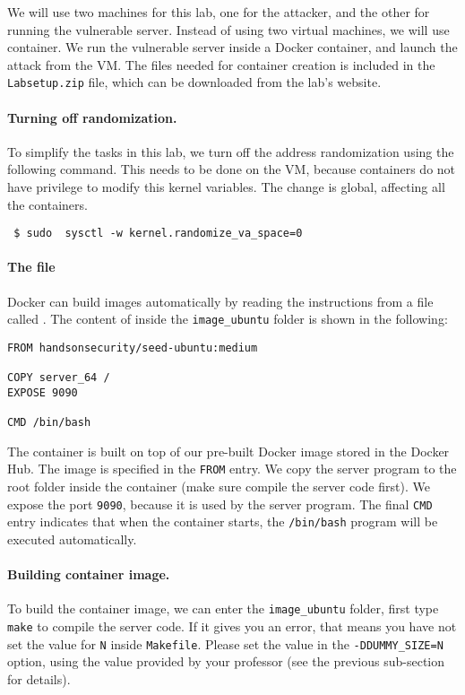 We will use two machines for this lab, one for the attacker,
and the other for running the vulnerable server. Instead of 
using two virtual machines, we will use container. 
We run the vulnerable server inside a Docker container, and 
launch the attack from the VM. The files needed for 
container creation is included in the \texttt{Labsetup.zip}
file, which can be downloaded from the lab's website. 



\paragraph{Turning off randomization.} 
To simplify the tasks in this lab, we turn off the address randomization
using the following command. This needs to be done on the VM, because
containers do not have privilege to modify this kernel variables. 
The change is global, affecting all the containers. 

\begin{lstlisting}
 $ sudo  sysctl -w kernel.randomize_va_space=0
\end{lstlisting}



\paragraph{The \dockerfile file} 
Docker can build images automatically by reading the instructions from a 
file called \dockerfile. The content of \dockerfile 
inside the \texttt{image\_ubuntu} folder is shown in the following:

\begin{lstlisting}
FROM handsonsecurity/seed-ubuntu:medium
  
COPY server_64 /
EXPOSE 9090

CMD /bin/bash
\end{lstlisting}
 

The container is built on top of our pre-built Docker image 
stored in the Docker Hub. The image is specified in the 
\texttt{FROM} entry. 
We copy the server program to the root folder inside the container (make sure 
compile the server code first). We expose the port \texttt{9090}, because
it is used by the server program. The final \texttt{CMD} entry
indicates that when the container starts, the \texttt{/bin/bash} program 
will be executed automatically. 


\paragraph{Building container image.}
To build the container image, we can enter the \texttt{image\_ubuntu} folder,
first type \texttt{make} to compile the server code.
If it gives you an error,
that means you have not set the value for \texttt{N} inside 
\texttt{Makefile}. Please set the value 
in the \texttt{-DDUMMY\_SIZE=N} option, using the value provided by your 
professor (see the previous sub-section for details). 

